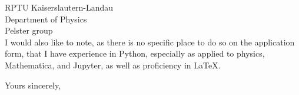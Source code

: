 \documentclass{letter}
\begin{document}
\begin{letter}{RPTU Kaiserslautern-Landau\\
    Department of Physics\\
    Pelster group\\}
I would also like to note, as there is no specific place to do so on the application form, that I have experience in Python, especially as applied to physics, Mathematica, and Jupyter, as well as proficiency in \LaTeX.\\

\closing{Yours sincerely,}

\end{letter}
\end{document}
